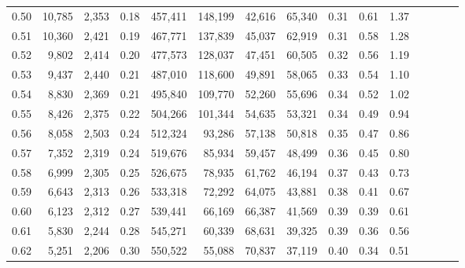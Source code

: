 \begin{tabular}{rrrcrrrrrrrrrrr}
0.50 &  10,785 &  2,353 &                                       0.18 &  457,411 &  148,199 &   42,616 &   65,340 &  0.31 &  0.61 &                         1.37 \\
0.51 &  10,360 &  2,421 &                                       0.19 &  467,771 &  137,839 &   45,037 &   62,919 &  0.31 &  0.58 &                         1.28 \\
0.52 &   9,802 &  2,414 &                                       0.20 &  477,573 &  128,037 &   47,451 &   60,505 &  0.32 &  0.56 &                         1.19 \\
0.53 &   9,437 &  2,440 &                                       0.21 &  487,010 &  118,600 &   49,891 &   58,065 &  0.33 &  0.54 &                         1.10 \\
0.54 &   8,830 &  2,369 &                                       0.21 &  495,840 &  109,770 &   52,260 &   55,696 &  0.34 &  0.52 &                         1.02 \\
0.55 &   8,426 &  2,375 &                                       0.22 &  504,266 &  101,344 &   54,635 &   53,321 &  0.34 &  0.49 &                         0.94 \\
0.56 &   8,058 &  2,503 &                                       0.24 &  512,324 &   93,286 &   57,138 &   50,818 &  0.35 &  0.47 &                         0.86 \\
0.57 &   7,352 &  2,319 &                                       0.24 &  519,676 &   85,934 &   59,457 &   48,499 &  0.36 &  0.45 &                         0.80 \\
0.58 &   6,999 &  2,305 &                                       0.25 &  526,675 &   78,935 &   61,762 &   46,194 &  0.37 &  0.43 &                         0.73 \\
0.59 &   6,643 &  2,313 &                                       0.26 &  533,318 &   72,292 &   64,075 &   43,881 &  0.38 &  0.41 &                         0.67 \\
0.60 &   6,123 &  2,312 &                                       0.27 &  539,441 &   66,169 &   66,387 &   41,569 &  0.39 &  0.39 &                         0.61 \\
0.61 &   5,830 &  2,244 &                                       0.28 &  545,271 &   60,339 &   68,631 &   39,325 &  0.39 &  0.36 &                         0.56 \\
0.62 &   5,251 &  2,206 &                                       0.30 &  550,522 &   55,088 &   70,837 &   37,119 &  0.40 &  0.34 &                         0.51 \\

\end{tabular}
